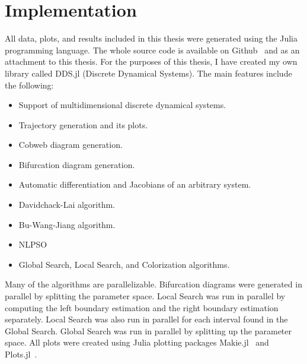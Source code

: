\section{Implementation}
All data, plots, and results included in this thesis were generated using the Julia programming language.
The whole source code is available on Github~\cite{thesis} and as an attachment to this thesis.
For the purposes of this thesis, I have created my own library called DDS.jl (Discrete Dynamical Systems).
The main features include the following:
\begin{itemize}
    \item Support of multidimensional discrete dynamical systems.
    \item Trajectory generation and its plots.
    \item Cobweb diagram generation.
    \item Bifurcation diagram generation.
    \item Automatic differentiation and Jacobians of an arbitrary system.
    \item Davidchack-Lai algorithm.
    \item Bu-Wang-Jiang algorithm.
    \item NLPSO
    \item Global Search, Local Search, and Colorization algorithms.
\end{itemize}
Many of the algorithms are parallelizable.
Bifurcation diagrams were generated in parallel by splitting the parameter space.
Local Search was run in parallel by computing the left boundary estimation and the right boundary estimation separately.
Local Search was also run in parallel for each interval found in the Global Search.
Global Search was run in parallel by splitting up the parameter space.
All plots were created using Julia plotting packages Makie.jl~\cite{Danisch2021} and Plots.jl~\cite{Christ2022}.

\endinput
